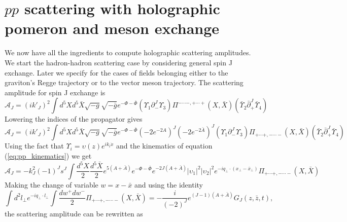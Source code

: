 \documentclass[a4paper,12pt]{article}
\begin{document}
\section{$pp$ scattering with holographic pomeron and meson exchange}

We now have all the ingredients to compute holographic scattering amplitudes. We start the hadron-hadron scattering case by considering general spin J exchange. Later we specify for the cases of fields belonging either to the graviton's Regge trajectory or to the vector meson trajectory. The scattering amplitude for spin J exchange is
\begin{equation}
\mathcal{A}_J = {\left(i k'_J\right)}^2 \int d^5X d^5\bar{X} \sqrt{-g} \sqrt{-\bar{g}} e^{- \Phi -\bar{\Phi}} \left(\Upsilon_1 \partial_{-}^J \Upsilon_3\right) \Pi^{-\cdots-, + \cdots +} \left(X, \bar{X}\right) \left(\bar{\Upsilon}_2 \bar{\partial}_{+}^J \bar{\Upsilon}_4\right)
\end{equation}
Lowering the indices of the propagator gives
\begin{equation}
\mathcal{A}_J = {\left(i k'_J\right)}^2 \int d^5X d^5\bar{X} \sqrt{-g} \sqrt{-\bar{g}} e^{- \Phi -\bar{\Phi}} {\left(-2 e^{-2 A }\right)}^J {\left(-2 e^{-2 \bar{A} }\right)}^J \left(\Upsilon_1 \partial_{-}^J \Upsilon_3\right) \Pi_{+\cdots+, - \cdots -} \left(X, \bar{X}\right) \left(\bar{\Upsilon}_2 \bar{\partial}_{+}^J \bar{\Upsilon}_4\right)
\end{equation}
Using the fact that $\Upsilon_i = \upsilon\left(z\right) e^{i k_i \dot x}$ and the kinematics of equation (\ref{eq:pp_kinematics}) we get
\begin{equation}
\mathcal{A}_J = - k_J^2 {\left(-1\right)}^J s^J \int \frac{d^5X}{2}\frac{d^5\bar{X}}{2} e^{5\left(A+\bar{A}\right)} e^{-\Phi - \bar{\Phi}} e^{-2J\left(A+\bar{A}\right)} {|\upsilon_1|}^2 {|\upsilon_2|}^2 e^{-i q_\perp \cdot \left(x_\perp - \bar{x}_\perp\right)} \Pi_{+ \cdots +, - \cdots -} \left(X, \bar{X}\right)
\end{equation}
Making the change of variable $w = x - \bar{x}$  and using the identity
\begin{equation}
\int d^2 l_\perp e^{- i q_\perp \cdot l_\perp}\int \frac{dw^+ dw^-}{2} \Pi_{+\cdots+, - \cdots -} \left(X, \bar{X}\right) = - \frac{i}{\left(-2\right)^J} e^{\left(J-1\right)\left(A+\bar{A}\right)} G_J \left(z, \bar{z}, t\right),
\end{equation}
the scattering amplitude can be rewritten as
\end{document}
